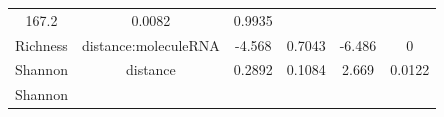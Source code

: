 \documentclass[]{article}
\begin{document}
\begin{longtable}[]{@{}cccccc@{}}
\begin{minipage}[t]{0.14\columnwidth}
167.2\strut
\end{minipage} & \begin{minipage}[t]{0.12\columnwidth}\centering\strut
0.0082\strut
\end{minipage} & \begin{minipage}[t]{0.09\columnwidth}\centering\strut
0.9935\strut
\end{minipage}\tabularnewline
\begin{minipage}[t]{0.12\columnwidth}\centering\strut
Richness\strut
\end{minipage} & \begin{minipage}[t]{0.24\columnwidth}\centering\strut
distance:moleculeRNA\strut
\end{minipage} & \begin{minipage}[t]{0.11\columnwidth}\centering\strut
-4.568\strut
\end{minipage} & \begin{minipage}[t]{0.14\columnwidth}\centering\strut
0.7043\strut
\end{minipage} & \begin{minipage}[t]{0.12\columnwidth}\centering\strut
-6.486\strut
\end{minipage} & \begin{minipage}[t]{0.09\columnwidth}\centering\strut
0\strut
\end{minipage}\tabularnewline
\begin{minipage}[t]{0.12\columnwidth}\centering\strut
Shannon\strut
\end{minipage} & \begin{minipage}[t]{0.24\columnwidth}\centering\strut
distance\strut
\end{minipage} & \begin{minipage}[t]{0.11\columnwidth}\centering\strut
0.2892\strut
\end{minipage} & \begin{minipage}[t]{0.14\columnwidth}\centering\strut
0.1084\strut
\end{minipage} & \begin{minipage}[t]{0.12\columnwidth}\centering\strut
2.669\strut
\end{minipage} & \begin{minipage}[t]{0.09\columnwidth}\centering\strut
0.0122\strut
\end{minipage}\tabularnewline
\begin{minipage}[t]{0.12\columnwidth}\centering\strut
Shannon\strut
\end{minipage} & \begin{minipage}[t]{0.24\columnwidth}\centering\strut

\end{minipage}
\end{longtable}
\end{document}

